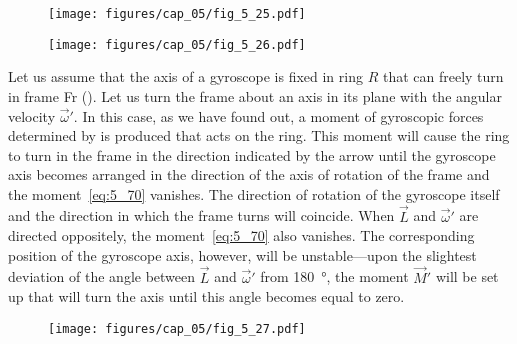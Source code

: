 \begin{figure}[t]
	\begin{minipage}[t]{0.45\linewidth}
		\begin{center}
			\texttt{[image: figures/cap\_05/fig\_5\_25.pdf]}
			\caption[]{}
			\label{fig:5_25}
		\end{center}
	\end{minipage}
	\hspace{-0.05cm}
	\begin{minipage}[t]{0.55\linewidth}
		\begin{center}
			\texttt{[image: figures/cap\_05/fig\_5\_26.pdf]}
			\caption[]{}
			\label{fig:5_26}
		\end{center}
	\end{minipage}
	\vspace{-0.65cm}
\end{figure}

Let us assume that the axis of a gyroscope is fixed in ring $R$ that can freely turn in frame Fr (). Let us turn the frame about an axis in its plane with the angular velocity $\vec{\omega}'$. In this case, as we have found out, a moment of gyroscopic forces determined by  is produced that acts on the ring. This moment will cause the ring to turn in the frame in the direction indicated by the arrow until the gyroscope axis becomes arranged in the direction of the axis of rotation of the frame and the moment~\eqref{eq:5_70} vanishes. The direction of rotation of the gyroscope itself and the direction in which the frame turns will coincide. When $\vec{L}$ and $\vec{\omega}'$ are directed oppositely, the moment~\eqref{eq:5_70} also vanishes. The corresponding position of the gyroscope axis, however, will be unstable---upon the slightest deviation of the angle between $\vec{L}$ and $\vec{\omega}'$ from \SI{180}{\degree}, the moment $\vec{M}'$ will be set up that will turn the axis until this angle becomes equal to zero.

\begin{figure}[t]
	\begin{center}
		\texttt{[image: figures/cap\_05/fig\_5\_27.pdf]}
		\caption[]{}
		\label{fig:5_27}
	\end{center}
	\vspace{-0.9cm}
\end{figure}

